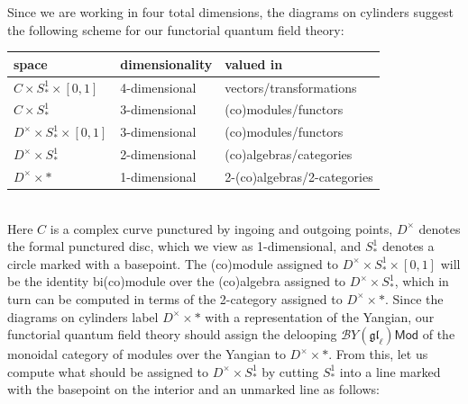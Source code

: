 \documentclass[11pt]{report}
\theoremstyle{definition}
\theoremstyle{remark}
\theoremstyle{remark}
\renewcommand{\P}{\mathbb{P}}
\begin{document}
Since we are working in four total dimensions, the diagrams on cylinders suggest the following scheme for our functorial quantum field theory:
~\\
\begin{center}
\begin{tabular}{|l|l|l|}
\hline
space & dimensionality & valued in \\
\hline
$C \times S_*^1 \times [0,1]$ & 4-dimensional & vectors/transformations \\
$C \times S_*^1$ & 3-dimensional & (co)modules/functors \\
$D^\times \times S_*^1 \times [0,1]$ & 3-dimensional & (co)modules/functors \\
$D^\times \times S_*^1$ & 2-dimensional & (co)algebras/categories \\
$D^\times \times *$ & 1-dimensional & 2-(co)algebras/2-categories \\
\hline
\end{tabular}
\end{center}
~\\
Here $C$ is a complex curve punctured by ingoing and outgoing points, $D^\times$ denotes the formal punctured disc, which we view as 1-dimensional, and $S_*^1$ denotes a circle marked with a basepoint. The (co)module assigned to $D^\times \times S_*^1 \times [0,1]$ will be the identity bi(co)module over the (co)algebra assigned to $D^\times \times S_*^1$, which in turn can be computed in terms of the 2-category assigned to $D^\times \times *$. Since the diagrams on cylinders label $D^\times \times *$ with a representation of the Yangian, our functorial quantum field theory should assign the delooping $\mathcal{B}Y(\mathfrak{gl}_\ell)\mathsf{Mod}$ of the monoidal category of modules over the Yangian to $D^\times \times *$. From this, let us compute what should be assigned to $D^\times \times S_*^1$ by cutting $S_*^1$ into a line marked with the basepoint on the interior and an unmarked line as follows:
~\\
\begin{center}
\end{center}
\end{document}
